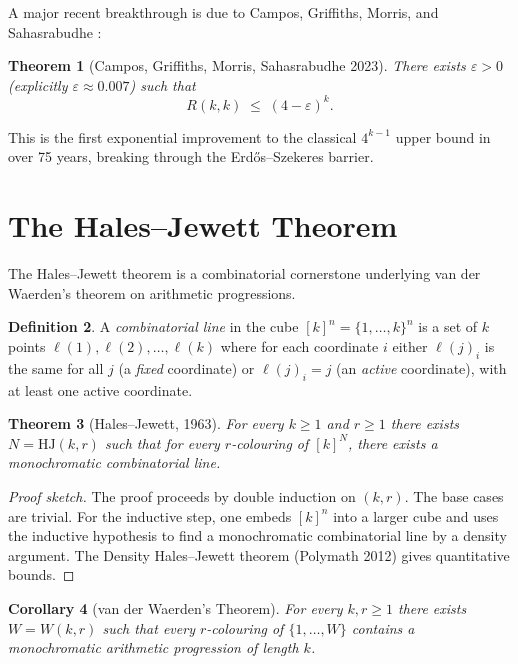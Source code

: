 \documentclass[12pt,a4paper]{amsart}
\newtheorem{theorem}{Theorem}[section]
\newtheorem{corollary}[theorem]{Corollary}
\theoremstyle{definition}
\newtheorem{definition}[theorem]{Definition}
\theoremstyle{remark}
\begin{document}
A major recent breakthrough is due to Campos, Griffiths, Morris, and
Sahasrabudhe \cite{Sah2023}:

\begin{theorem}[Campos, Griffiths, Morris, Sahasrabudhe 2023]
There exists $\varepsilon > 0$ (explicitly $\varepsilon \approx 0.007$) such that
\[
  R(k,k) \;\le\; (4-\varepsilon)^k.
\]
\end{theorem}

This is the first exponential improvement to the classical $4^{k-1}$ upper bound
in over 75 years, breaking through the Erd\H{o}s--Szekeres barrier.

\section{The Hales--Jewett Theorem}

The Hales--Jewett theorem \cite{HalesJewett1963} is a combinatorial cornerstone
underlying van der Waerden's theorem on arithmetic progressions.

\begin{definition}
A \emph{combinatorial line} in the cube $[k]^n = \{1,\ldots,k\}^n$ is a set of
$k$ points $\ell(1), \ell(2), \ldots, \ell(k)$ where for each coordinate $i$
either $\ell(j)_i$ is the same for all $j$ (a \emph{fixed} coordinate) or
$\ell(j)_i = j$ (an \emph{active} coordinate), with at least one active
coordinate.
\end{definition}

\begin{theorem}[Hales--Jewett, 1963]\label{thm:hales-jewett}
For every $k \ge 1$ and $r \ge 1$ there exists $N = \mathrm{HJ}(k,r)$ such
that for every $r$-colouring of $[k]^N$, there exists a monochromatic
combinatorial line.
\end{theorem}

\begin{proof}[Proof sketch]
The proof proceeds by double induction on $(k,r)$.  The base cases are trivial.
For the inductive step, one embeds $[k]^n$ into a larger cube and uses the
inductive hypothesis to find a monochromatic combinatorial line by a density
argument.  The Density Hales--Jewett theorem (Polymath 2012) gives quantitative
bounds.
\end{proof}

\begin{corollary}[van der Waerden's Theorem]
For every $k,r \ge 1$ there exists $W = W(k,r)$ such that every $r$-colouring
of $\{1,\ldots,W\}$ contains a monochromatic arithmetic progression of length $k$.
\end{corollary}
\end{document}
